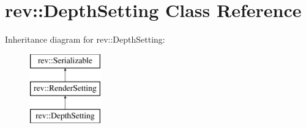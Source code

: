 \hypertarget{classrev_1_1_depth_setting}{}\section{rev\+::Depth\+Setting Class Reference}
\label{classrev_1_1_depth_setting}
Inheritance diagram for rev\+::Depth\+Setting\+:\begin{figure}[H]
\begin{center}
\leavevmode
\includegraphics[height=3.000000cm]{classrev_1_1_depth_setting}
\end{center}
\end{figure}
